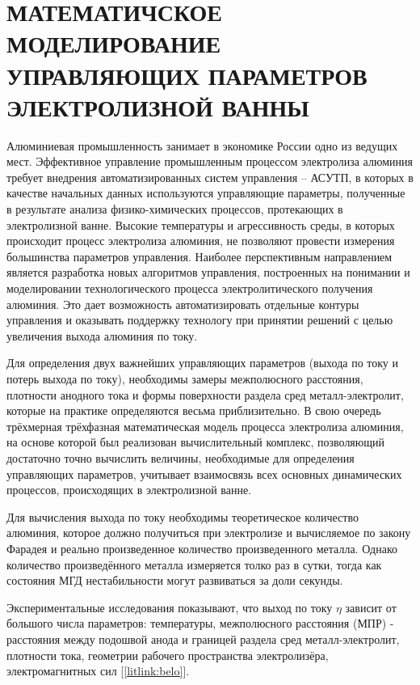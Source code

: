 \documentclass{article}
\begin{document}
\section{МАТЕМАТИЧСКОЕ МОДЕЛИРОВАНИЕ УПРАВЛЯЮЩИХ ПАРАМЕТРОВ ЭЛЕКТРОЛИЗНОЙ ВАННЫ}

Алюминиевая промышленность занимает в экономике России одно из ведущих мест. Эффективное управление промышленным процессом электролиза алюминия требует внедрения автоматизированных систем управления – АСУТП, в которых в качестве начальных данных используются управляющие параметры, полученные в результате анализа физико-химических процессов, протекающих в электролизной ванне.  Высокие температуры и агрессивность среды, в которых происходит процесс электролиза алюминия, не позволяют провести измерения большинства параметров управления. Наиболее перспективным направлением является разработка новых алгоритмов управления, построенных на понимании и моделировании технологического процесса электролитического получения алюминия. Это дает возможность автоматизировать отдельные контуры управления и оказывать поддержку технологу при принятии решений с целью увеличения выхода алюминия по току. 

Для определения двух важнейших управляющих параметров (выхода по току и потерь выхода по току), необходимы замеры межполюсного расстояния, плотности анодного тока и формы поверхности раздела сред металл-электролит, которые на практике определяются весьма приблизительно. В свою очередь трёхмерная трёхфазная математическая модель процесса электролиза алюминия, на основе которой был реализован вычислительный комплекс, позволяющий достаточно точно вычислить величины, необходимые для определения управляющих параметров, учитывает взаимосвязь всех основных динамических процессов, происходящих в электролизной ванне.

Для вычисления выхода по току необходимы теоретическое количество алюминия, которое должно получиться при электролизе и вычисляемое по закону Фарадея и реально
произведенное количество произведенного металла.
Однако количество произведённого металла  измеряется толко раз в сутки, тогда как состояния МГД нестабильности могут развиваться за доли секунды.

Экспериментальные исследования показывают, что выход по току $\eta$ зависит от большого числа параметров: температуры, межполюсного расстояния (МПР) - расстояния между подошвой анода и границей раздела сред металл-электролит, плотности тока, геометрии рабочего пространства электролизёра, электромагнитных сил [\ref{litlink:belo}].
\end{document}
